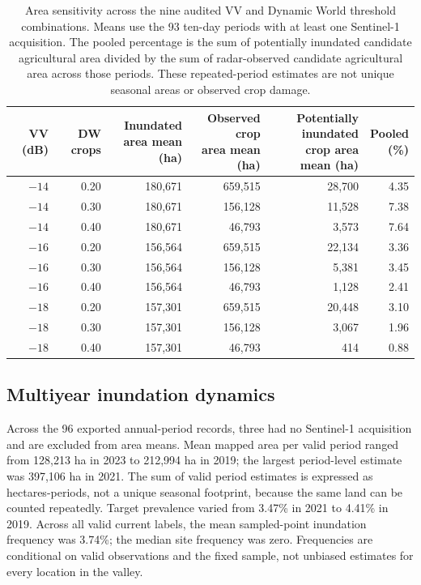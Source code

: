 \documentclass[pdflatex,sn-mathphys,Numbered]{sn-jnl}
\begin{document}
\begin{table}[t]
\centering
\caption{Area sensitivity across the nine audited VV and Dynamic World threshold combinations. Means use the 93 ten-day periods with at least one Sentinel-1 acquisition. The pooled percentage is the sum of potentially inundated candidate agricultural area divided by the sum of radar-observed candidate agricultural area across those periods. These repeated-period estimates are not unique seasonal areas or observed crop damage.}
\label{tab:threshold-area-sensitivity}
\small
\setlength{\tabcolsep}{3pt}
\begin{tabular}{rrrrrr}
\toprule
VV (dB) & DW crops & \makecell{Inundated\\area mean (ha)} & \makecell{Observed crop\\area mean (ha)} & \makecell{Potentially inundated\\crop area mean (ha)} & \makecell{Pooled\\(\%)} \\
\midrule
$-14$ & 0.20 & 180,671 & 659,515 & 28,700 & 4.35 \\
$-14$ & 0.30 & 180,671 & 156,128 & 11,528 & 7.38 \\
$-14$ & 0.40 & 180,671 & 46,793 & 3,573 & 7.64 \\
$-16$ & 0.20 & 156,564 & 659,515 & 22,134 & 3.36 \\
$-16$ & 0.30 & 156,564 & 156,128 & 5,381 & 3.45 \\
$-16$ & 0.40 & 156,564 & 46,793 & 1,128 & 2.41 \\
$-18$ & 0.20 & 157,301 & 659,515 & 20,448 & 3.10 \\
$-18$ & 0.30 & 157,301 & 156,128 & 3,067 & 1.96 \\
$-18$ & 0.40 & 157,301 & 46,793 & 414 & 0.88 \\
\bottomrule
\end{tabular}
\end{table}

\subsection{Multiyear inundation dynamics}
Across the 96 exported annual-period records, three had no Sentinel-1 acquisition and are excluded from area means. Mean mapped area per valid period ranged from 128,213 ha in 2023 to 212,994 ha in 2019; the largest period-level estimate was 397,106 ha in 2021. The sum of valid period estimates is expressed as hectares-periods, not a unique seasonal footprint, because the same land can be counted repeatedly. Target prevalence varied from 3.47\% in 2021 to 4.41\% in 2019. Across all valid current labels, the mean sampled-point inundation frequency was 3.74\%; the median site frequency was zero. Frequencies are conditional on valid observations and the fixed sample, not unbiased estimates for every location in the valley.
\end{document}
